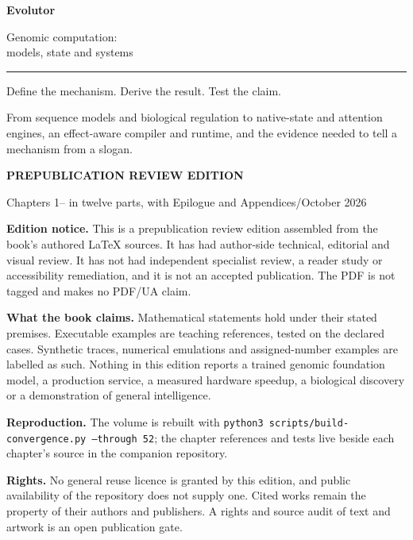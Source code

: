 \begin{titlepage}
\raggedright\sffamily
\vspace*{30mm}
{\color{Blue}\fontsize{44}{48}\selectfont\bfseries Evolutor\par}
\vspace{9mm}
{\color{Blue}\LARGE Genomic computation:\\[2pt] models, state and systems\par}
\vspace{12mm}
{\color{Blue}\rule{\linewidth}{0.9pt}\par}
\vspace{7mm}
{\large\color{Ink}Define the mechanism. Derive the result. Test the claim.\par}
\vspace{4mm}
{\normalsize\color{Slate}From sequence models and biological regulation to native-state and
attention engines, an effect-aware compiler and runtime, and the evidence needed
to tell a mechanism from a slogan.\par}
\vfill
{\color{Blue}\small\bfseries PREPUBLICATION REVIEW EDITION\par}
{\color{Slate}\small Chapters 1--\IncludedThrough{} in twelve parts, with Epilogue and Appendices\quad/\quad October 2026\par}
\end{titlepage}
\thispagestyle{empty}
\vspace*{\fill}
{\small\raggedright
\textbf{Edition notice.} This is a prepublication review edition assembled from the
book's authored \LaTeX{} sources. It has had author-side technical, editorial and visual
review. It has not had independent specialist review, a reader study or accessibility
remediation, and it is not an accepted publication. The PDF is not tagged and makes no
PDF/UA claim.\par\medskip
\textbf{What the book claims.} Mathematical statements hold under their stated premises.
Executable examples are teaching references, tested on the declared cases. Synthetic
traces, numerical emulations and assigned-number examples are labelled as such. Nothing
in this edition reports a trained genomic foundation model, a production service, a
measured hardware speedup, a biological discovery or a demonstration of general
intelligence.\par\medskip
\textbf{Reproduction.} The volume is rebuilt with
\texttt{python3 scripts/build-convergence.py --through 52}; the chapter references and
tests live beside each chapter's source in the companion repository.\par\medskip
\textbf{Rights.} No general reuse licence is granted by this edition, and public
availability of the repository does not supply one. Cited works remain the property of
their authors and publishers. A rights and source audit of text and artwork is an
open publication gate.\par}
\clearpage
